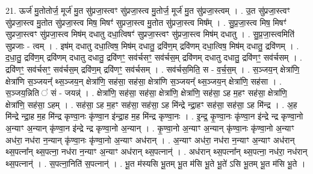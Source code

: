 \documentclass[17pt]{extarticle}
\begin{document}
21. ऊर्ज॑ मु॒तोतोर्ज॒ मूर्ज॑ मु॒त सु॑प्रजा॒स्त्वꣳ सु॑प्रजा॒स्त्व मु॒तोर्ज॒ मूर्ज॑ मु॒त सु॑प्रजा॒स्त्वम् । . उ॒त सु॑प्रजा॒स्त्वꣳ सु॑प्रजा॒स्त्व मु॒तोत सु॑प्रजा॒स्त्व मिष॒ मिषꣳ॑ सुप्रजा॒स्त्व मु॒तोत सु॑प्रजा॒स्त्व मिष᳚म् । . सु॒प्र॒जा॒स्त्व मिष॒ मिषꣳ॑ सुप्रजा॒स्त्वꣳ सु॑प्रजा॒स्त्व मिष॑म् दधातु दधा॒त्विषꣳ॑ सुप्रजा॒स्त्वꣳ सु॑प्रजा॒स्त्व मिष॑म् दधातु । . सु॒प्र॒जा॒स्त्वमिति॑ सुप्रजाः - त्वम् । . इष॑म् दधातु दधा॒त्विष॒ मिष॑म् दधातु॒ द्रवि॑ण॒म् द्रवि॑णम् दधा॒त्विष॒ मिष॑म् दधातु॒ द्रवि॑णम् । . द॒धा॒तु॒ द्रवि॑ण॒म् द्रवि॑णम् दधातु दधातु॒ द्रवि॑णꣳ॒॒ सव॑र्चसꣳ॒॒ सव॑र्चस॒म् द्रवि॑णम् दधातु दधातु॒ द्रवि॑णꣳ॒॒ सव॑र्चसम् । . द्रवि॑णꣳ॒॒ सव॑र्चसꣳ॒॒ सव॑र्चस॒म् द्रवि॑ण॒म् द्रवि॑णꣳ॒॒ सव॑र्चसम् । . सव॑र्चस॒मिति॒ स - व॒र्च॒स॒म् । . स॒ञ्जय॒न् क्षेत्रा॑णि॒ क्षेत्रा॑णि स॒ञ्जयन्᳚ थ्स॒ञ्जय॒न् क्षेत्रा॑णि॒ सह॑सा॒ सह॑सा॒ क्षेत्रा॑णि स॒ञ्जयन्᳚ थ्स॒ञ्जय॒न् क्षेत्रा॑णि॒ सह॑सा । . स॒ञ्जय॒न्निति ॑ सं - जयन्न्॑ । . क्षेत्रा॑णि॒ सह॑सा॒ सह॑सा॒ क्षेत्रा॑णि॒ क्षेत्रा॑णि॒ सह॑सा॒ ऽह म॒हꣳ सह॑सा॒ क्षेत्रा॑णि॒ क्षेत्रा॑णि॒ सह॑सा॒ ऽहम् । . सह॑सा॒ ऽह म॒हꣳ सह॑सा॒ सह॑सा॒ ऽह मि॑न्द्रे न्द्रा॒हꣳ सह॑सा॒ सह॑सा॒ ऽह मि॑न्द्र । . अ॒ह मि॑न्द्रे न्द्रा॒ह म॒ह मि॑न्द्र कृण्वा॒नः कृ॑ण्वा॒न इ॑न्द्रा॒ह म॒ह मि॑न्द्र कृण्वा॒नः । . इ॒न्द्र॒ कृ॒ण्वा॒नः कृ॑ण्वा॒न इ॑न्द्रे न्द्र कृण्वा॒नो अ॒न्याꣳ अ॒न्यान् कृ॑ण्वा॒न इ॑न्द्रे न्द्र कृण्वा॒नो अ॒न्यान् । . कृ॒ण्वा॒नो अ॒न्याꣳ अ॒न्यान् कृ॑ण्वा॒नः कृ॑ण्वा॒नो अ॒न्याꣳ अध॑रा॒ नध॑रा न॒न्यान् कृ॑ण्वा॒नः कृ॑ण्वा॒नो अ॒न्याꣳ अध॑रान् । . अ॒न्याꣳ अध॑रा॒ नध॑रा न॒न्याꣳ अ॒न्याꣳ अध॑रान् थ्स॒पत्ना᳚न् थ्स॒पत्ना॒ नध॑रा न॒न्याꣳ अ॒न्याꣳ अध॑रान् थ्स॒पत्नान्॑ । . अध॑रान् थ्स॒पत्ना᳚न् थ्स॒पत्ना॒ नध॑रा॒ नध॑रान् थ्स॒पत्नान्॑ । . स॒पत्ना॒निति॑ स॒पत्नान्॑ । . भू॒त म॑स्यसि भू॒तम् भू॒त म॑सि भू॒ते भू॒ते॑ ऽसि भू॒तम् भू॒त म॑सि भू॒ते । \newline
\end{document}
